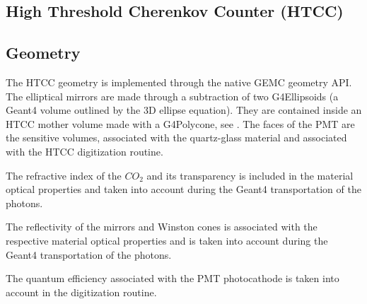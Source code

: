 \subsection{High Threshold Cherenkov Counter (HTCC)}

\subsection{Geometry}

The HTCC geometry is implemented through the native GEMC geometry API. The elliptical mirrors are made through a subtraction of
two G4Ellipsoids (a Geant4 volume outlined by the 3D ellipse equation).
They are contained inside an HTCC mother volume made with a G4Polycone, see .
The faces of the PMT are the sensitive volumes, associated with the quartz-glass material and associated with the HTCC digitization routine.

The refractive index of the $CO_2$ and its transparency is included in the material optical properties and taken
into account during the Geant4 transportation of the photons.

The reflectivity of the mirrors and Winston cones is associated with the respective material optical properties and is taken into
account during the Geant4 transportation of the photons.

The quantum efficiency associated with the PMT photocathode is taken into account in
the digitization routine.


